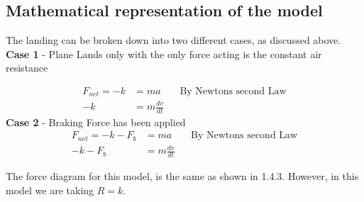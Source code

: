 \subsection{Mathematical representation of the model}
The landing can be broken down into two different cases, as discussed above.
\\
\textbf{Case 1} - Plane Lands only with the only force acting is the constant air resistance

\begin{align*}
    F_{net} = -k &= ma && \text{By Newtons second Law}
    \\ -k &= m \frac{dv}{dt}
\end{align*}
\textbf{Case 2} - Braking Force has been applied
\begin{align*}
    F_{net} = -k - F_b &= ma && \text{By Newtons second Law}
    \\-k - F_b &= m \frac{dv}{dt}
\end{align*}

The force diagram for this model, is the same as shown in 1.4.3. However, in this model we are taking $R = k$.